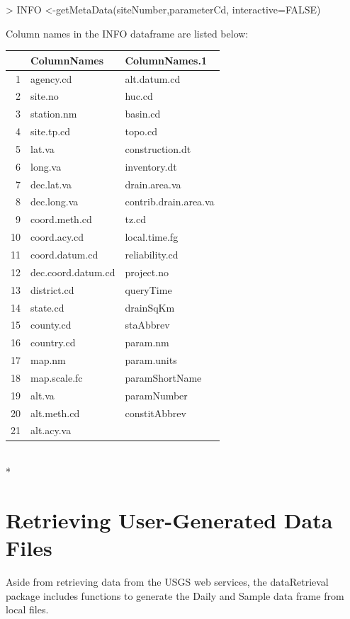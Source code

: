 \documentclass[a4paper,11pt]{article}
\begin{document}
\begin{Schunk}
\begin{Sinput}
> INFO <-getMetaData(siteNumber,parameterCd, interactive=FALSE)
\end{Sinput}
\end{Schunk}

Column names in the INFO dataframe are listed below:

\begin{tabular}{rll}
  \hline
 & ColumnNames & ColumnNames.1 \\ 
  \hline
1 & agency.cd & alt.datum.cd \\ 
  2 & site.no & huc.cd \\ 
  3 & station.nm & basin.cd \\ 
  4 & site.tp.cd & topo.cd \\ 
  5 & lat.va & construction.dt \\ 
  6 & long.va & inventory.dt \\ 
  7 & dec.lat.va & drain.area.va \\ 
  8 & dec.long.va & contrib.drain.area.va \\ 
  9 & coord.meth.cd & tz.cd \\ 
  10 & coord.acy.cd & local.time.fg \\ 
  11 & coord.datum.cd & reliability.cd \\ 
  12 & dec.coord.datum.cd & project.no \\ 
  13 & district.cd & queryTime \\ 
  14 & state.cd & drainSqKm \\ 
  15 & county.cd & staAbbrev \\ 
  16 & country.cd & param.nm \\ 
  17 & map.nm & param.units \\ 
  18 & map.scale.fc & paramShortName \\ 
  19 & alt.va & paramNumber \\ 
  20 & alt.meth.cd & constitAbbrev \\ 
  21 & alt.acy.va &  \\ 
   \hline
\end{tabular}
\\*


\newpage
\section{Retrieving User-Generated Data Files}
Aside from retrieving data from the USGS web services, the dataRetrieval package includes functions to generate the Daily and Sample data frame from local files.
\end{document}
